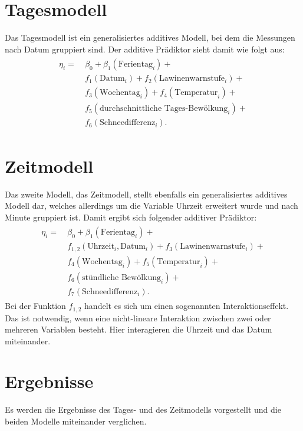 \documentclass[12pt]{scrreprt}
\begin{document}
\section{Tagesmodell}
Das Tagesmodell ist ein generalisiertes additives Modell, bei dem die Messungen nach Datum gruppiert sind. Der additive Prädiktor sieht damit wie folgt aus:
\begin{align}
\begin{split}
\eta_{i}= ~ &\beta_{0}+\beta_{1}(\text{Ferientag}_{i})+ \\
&f_{1}(\text{Datum}_{i})+f_{2}(\text{Lawinenwarnstufe}_{i})+ \\
&f_{3}(\text{Wochentag}_{i})+ f_{4}(\text{Temperatur}_{i})+ \\ &f_{5}(\text{durchschnittliche Tages-Bewölkung}_{i})+ \\
&f_{6}(\text{Schneedifferenz}_{i}).
\end{split}
\end{align}

\section{Zeitmodell}
Das zweite Modell, das Zeitmodell, stellt ebenfalls ein generalisiertes additives Modell dar, welches allerdings um die Variable Uhrzeit erweitert wurde und nach Minute gruppiert ist. Damit ergibt sich folgender additiver Prädiktor:
\begin{align}
\begin{split}
\eta_{i}= ~ &\beta_{0}+\beta_{1}(\text{Ferientag}_{i})+ \\
&f_{1,2}(\text{Uhrzeit}_{i},\text{Datum}_{i})+f_{3}(\text{Lawinenwarnstufe}_{i})+ \\
&f_{4}(\text{Wochentag}_{i})+f_{5}(\text{Temperatur}_{i})+ \\
&f_{6}(\text{stündliche Bewölkung}_{i})+ \\
&f_{7}(\text{Schneedifferenz}_{i}).
\end{split}
\end{align}
Bei der Funktion $f_{1,2}$ handelt es sich um einen sogenannten Interaktionseffekt. Das ist notwendig, wenn eine nicht-lineare Interaktion zwischen zwei oder mehreren Variablen besteht. Hier interagieren die Uhrzeit und das Datum miteinander.

\section{Ergebnisse}
Es werden die Ergebnisse des Tages- und des Zeitmodells vorgestellt und die beiden Modelle miteinander verglichen.
\end{document}

